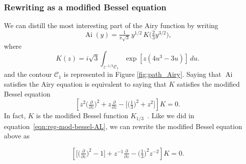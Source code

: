\documentclass{article}
\DeclareMathOperator{\Ai}{Ai}
\theoremstyle{definition}
\theoremstyle{plain}
\begin{document}
\subsubsection{Rewriting as a modified Bessel equation}
We can distill the most interesting part of the Airy function by writing
\[ \Ai(y) = \tfrac{1}{\pi\sqrt{3}}\,y^{1/2}\,K\big(\tfrac{2}{3} y^{3/2}\big), \]
where
\begin{equation}\label{integral:mod-bessel}
K(z) = i\sqrt{3} \int_{z^{-1/3}\mathcal{C}_1} \exp\left[z \left(4u^3 - 3u\right)\right]\,du.
\end{equation}
and the contour $\mathcal{C}_1$ is represented in Figure \ref{fig:path_Airy}.
Saying that $\Ai$ satisfies the Airy equation is equivalent to saying that $K$ satisfies the modified Bessel equation
\begin{equation}\label{eqn:mod-bessel-1/3}
\left[z^2 \big(\tfrac{\partial}{\partial z}\big)^2 + z \tfrac{\partial}{\partial z} - \big[\big(\tfrac{1}{3}\big)^2 + z^2\big]\right] K = 0.
\end{equation}
In fact, $K$ is the modified Bessel function $K_{1/3}$~\cite[equation~9.6.1]{dlmf}.
Like we did in equation~\eqref{eqn:reg-mod-bessel-AL}, we can rewrite the modified Bessel equation above as 

\begin{equation}\label{eqn:reg-mod-bessel}
\left[ \big[ \big(\tfrac{\partial}{\partial z}\big)^2 - 1 \big] + z^{-1} \tfrac{\partial}{\partial z} - \big(\tfrac{1}{3}\big)^2 z^{-2} \right] K = 0.
\end{equation}
%
\end{document}
